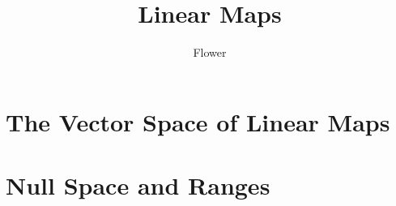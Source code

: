 \documentclass[
	12pt, %
]{fphw}
\title{Linear Maps} %
\author{Flower} %
\date{} %
\institute{University of Mars \\ Institute of Intergalactic Travel} %
\begin{document}
\maketitle %


\section{The Vector Space of Linear Maps}










\section{Null Space and Ranges}



\end{document}
